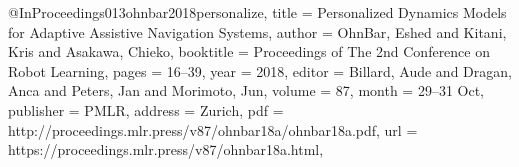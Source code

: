 @InProceedings{013ohnbar2018personalize,
title = 	 {Personalized Dynamics Models for Adaptive Assistive Navigation Systems},
author =       {OhnBar, Eshed and Kitani, Kris and Asakawa, Chieko},
booktitle = 	 {Proceedings of The 2nd Conference on Robot Learning},
pages = 	 {16--39},
year = 	 {2018},
editor = 	 {Billard, Aude and Dragan, Anca and Peters, Jan and Morimoto, Jun},
volume = 	 {87},
month = 	 {29--31 Oct},
publisher =    {PMLR},
address = {Zurich},
pdf = 	 {http://proceedings.mlr.press/v87/ohnbar18a/ohnbar18a.pdf},
url = 	 {https://proceedings.mlr.press/v87/ohnbar18a.html},
}